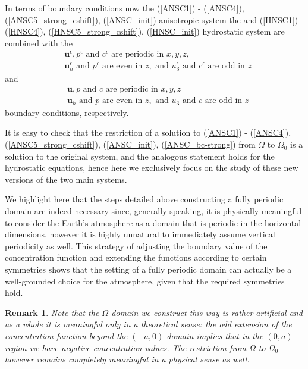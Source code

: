 \documentclass[11pt]{article}
\newtheorem{remark}{Remark}
\begin{document}
In terms of boundary conditions now the (\ref{ANSC1}) - (\ref{ANSC4}), (\ref{ANSC5_strong_cshift}), (\ref{ANSC_init}) anisotropic system the and (\ref{HNSC1}) - (\ref{HNSC4}), (\ref{HNSC5_strong_cshift}), (\ref{HNSC_init}) hydrostatic system are combined with the
%
\begin{equation} \label{ANSC_bc-strong}
\begin{split}
& \mathbf{u}^\epsilon, p^\epsilon \text{ and } c^\epsilon \text{ are periodic in } x,y,z, \\
& \mathbf{u}_h^\epsilon \text{ and } p^\epsilon \text{ are even in $z$}, \text{ and } u_3^\epsilon \text{ and } c^\epsilon \text{ are odd in $z$}
\end{split}
\end{equation}
%
and
%
\begin{equation} \label{HNSC_bc-strong}
\begin{split}
& \mathbf{u}, p \text{ and } c \text{ are periodic in } x,y,z \\
& \mathbf{u}_h \text{ and } p \text{ are even in $z$}, \text{ and } u_3 \text{ and } c \text{ are odd in $z$}
\end{split}
\end{equation}
%
boundary conditions, respectively.

It is easy to check that the restriction of a solution to (\ref{ANSC1}) - (\ref{ANSC4}), (\ref{ANSC5_strong_cshift}), (\ref{ANSC_init}), (\ref{ANSC_bc-strong}) from $\Omega$ to $\Omega_0$ is a solution to the original system, and the analogous statement holds for the hydrostatic equations, hence here we exclusively focus on the study of these new versions of the two main systems.

We highlight here that the steps detailed above constructing a fully periodic domain are indeed necessary since, generally speaking, it is physically meaningful to consider the Earth's atmosphere as a domain that is periodic in the horizontal dimensions, however it is highly unnatural to immediately assume vertical periodicity as well. This strategy of adjusting the boundary value of the concentration function and extending the functions according to certain symmetries shows that the setting of a fully periodic domain can actually be a well-grounded choice for the atmosphere, given that the required symmetries hold.

\begin{remark}
\normalfont Note that the $\Omega$ domain we construct this way is rather artificial and as a whole it is meaningful only in a theoretical sense: the odd extension of the concentration function beyond the $(-a, 0)$ domain implies that in the $(0,a)$ region we have negative concentration values. The restriction from $\Omega$ to $\Omega_0$ however remains completely meaningful in a physical sense as well.
\end{remark}
\end{document}

